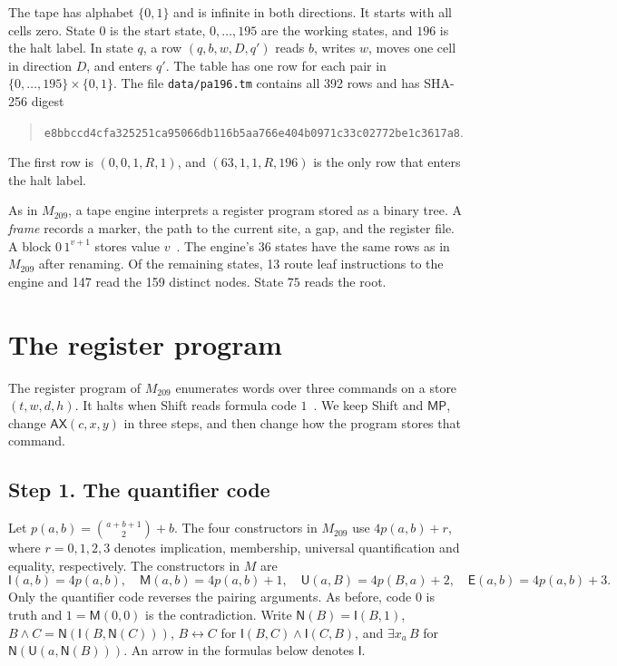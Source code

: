\documentclass[11pt,letterpaper]{article}
\newcommand{\ax}{\mathsf{AX}}
\newcommand{\mpc}{\mathsf{MP}}
\newcommand{\Ic}{\mathsf{I}}
\newcommand{\Mc}{\mathsf{M}}
\newcommand{\Uc}{\mathsf{U}}
\newcommand{\Ec}{\mathsf{E}}
\newcommand{\Nc}{\mathsf{N}}
\newcommand{\file}[1]{\texttt{\nolinkurl{#1}}}
\begin{document}
The tape has alphabet $\{0,1\}$ and is infinite in both directions.
It starts with all cells zero. State $0$ is the start state,
$0,\ldots,195$ are the working states, and $196$ is the halt label. In state $q$, a row
$(q,b,w,D,q')$ reads $b$, writes $w$, moves one cell in direction $D$,
and enters $q'$. The table has one row for each pair in
$\{0,\ldots,195\}\times\{0,1\}$. The file \file{data/pa196.tm} contains
all 392 rows and has SHA-256 digest
\begin{quote}\small
\nolinkurl{e8bbccd4cfa325251ca95066db116b5aa766e404b0971c33c02772be1c3617a8}.
\end{quote}
The first row is $(0,0,1,R,1)$, and $(63,1,1,R,196)$ is the only row
that enters the halt label.

As in $M_{209}$, a tape engine interprets a register program stored
as a binary tree. A \emph{frame} records a marker, the path to the
current site, a gap, and the register file. A block $0\,1^{v+1}$
stores value $v$~\cite[\S3]{pa209}. The engine's 36 states have
the same rows as in $M_{209}$ after renaming. Of the remaining states,
13 route leaf instructions to the engine and 147 read the 159
distinct nodes. State $75$ reads the root.

\section{The register program}\label{sec:steps}

The register program of $M_{209}$ enumerates words over three commands
on a store $(t,w,d,h)$. It halts when Shift reads formula code
$1$~\cite[\S4]{pa209}. We keep Shift and $\mpc$, change $\ax(c,x,y)$
in three steps, and then change how the program stores that command.

\subsection{Step 1. The quantifier code}

Let $p(a,b)=\binom{a+b+1}{2}+b$. The four constructors in $M_{209}$
use $4p(a,b)+r$, where $r=0,1,2,3$ denotes implication, membership,
universal quantification and equality, respectively. The constructors
in $M$ are
\[
 \Ic(a,b)=4p(a,b),\quad \Mc(a,b)=4p(a,b)+1,\quad
 \Uc(a,B)=4p(B,a)+2,\quad \Ec(a,b)=4p(a,b)+3 .
\]
Only the quantifier code reverses the pairing arguments. As before,
code $0$ is truth and $1=\Mc(0,0)$ is the contradiction. Write
$\Nc(B)=\Ic(B,1)$, $B\wedge C=\Nc(\Ic(B,\Nc(C)))$,
$B\leftrightarrow C$ for $\Ic(B,C)\wedge\Ic(C,B)$, and
$\exists x_a\,B$ for $\Nc(\Uc(a,\Nc(B)))$. An arrow in the formulas
below denotes $\Ic$.
\end{document}
